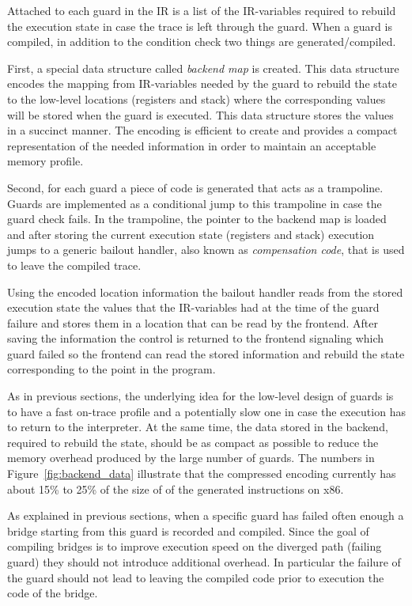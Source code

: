 \documentclass[10pt,preprint]{sigplanconf}
\begin{document}
Attached to each guard in the IR is a list of the IR-variables required to
rebuild the execution state in case the trace is left through
the guard. When a guard is compiled, in addition to the
condition check two things are generated/compiled.

First, a special data
structure called \emph{backend map} is created. This data structure encodes the
mapping from IR-variables needed by the guard to rebuild the state to the
low-level locations (registers and stack) where the corresponding values will
be stored when the guard is executed.
This data
structure stores the values in a succinct manner. The encoding is efficient to create and
provides a compact representation of the needed information in order
to maintain an acceptable memory profile.

Second, for each guard a piece of code is generated that acts as a trampoline.
Guards are implemented as a conditional jump to this trampoline in case the
guard check fails.
In the trampoline, the pointer to the
backend map is loaded and after storing the current execution state
(registers and stack) execution jumps to a generic bailout handler, also known
as \emph{compensation code},
that is used to leave the compiled trace.

Using the encoded location information the bailout handler reads from the
stored execution state the values that the IR-variables had at the time of the
guard failure and stores them in a location that can be read by the frontend.
After saving the information the control is returned to the frontend signaling
which guard failed so the frontend can read the stored information and rebuild
the state corresponding to the point in the program.

As in previous sections, the underlying idea for the low-level design of guards is to have
a fast on-trace profile and a potentially slow one in case
the execution has to return to the interpreter. At the same
time, the data stored in the backend, required to rebuild the state, should be as
compact as possible to reduce the memory overhead produced by the large number
of guards. The numbers in Figure~\ref{fig:backend_data} illustrate that the
compressed encoding currently has about 15\% to 25\% of the size of of the
generated instructions on x86.

As explained in previous sections, when a specific guard has failed often enough
a bridge starting from this guard is recorded and compiled.
Since the goal of compiling bridges is to improve execution speed on the
diverged path (failing guard) they should not introduce additional overhead.
In particular the failure of the guard should not lead
to leaving the compiled code prior to execution the code of the bridge.
\end{document}

